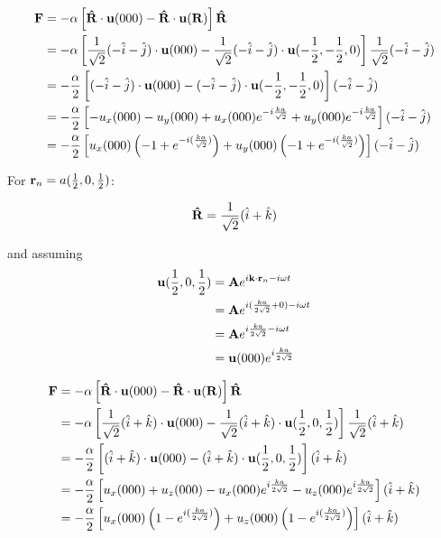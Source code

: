 \documentclass{article}
\begin{document}
\begin{align}
  \mathbf{F} &= - \alpha \left[ \mathbf{\hat{R}}\cdot \mathbf{u}(000) -
  \mathbf{\hat{R}}\cdot
  \mathbf{u}(\mathbf{R})\right]\mathbf{\hat{R}}\\
  &=- \alpha \left[ {1\over \sqrt{2}} (-\hat{i} - \hat{j}) \cdot
    \mathbf{u}(000) - {1\over \sqrt{2}} (-\hat{i} - \hat{j}) \cdot
    \mathbf{u}(-{1\over 2},-{1\over 2},0)\right]{1\over \sqrt{2}}(-\hat{i}
    - \hat{j})\\
  &=- {\alpha\over 2} \left[ (-\hat{i} - \hat{j}) \cdot
    \mathbf{u}(000) - (-\hat{i} - \hat{j}) \cdot
    \mathbf{u}(-{1\over 2},-{1\over 2},0)\right](-\hat{i}
    - \hat{j})\\
  &=- {\alpha\over 2} \left[-u_x(000) - u_y(000) + u_x(000) e^{-i {k a\over \sqrt{2}}} + u_y(000) e^{-i {k a\over \sqrt{2}}} \right](-\hat{i}
    - \hat{j}) \\
    &=- {\alpha\over 2} \left[ u_x(000)\left( -1 + e^{-i ({k
    a\over \sqrt{2}} )} \right) + u_y(000)\left(-1+ e^{-i ({k a\over \sqrt{2}} )}\right) \right](-\hat{i}
    - \hat{j}) \label{eq:F4}\\
\end{align}


For $\mathbf{r}_n = a({1\over
  2},0,{1\over 2})$:

\begin{equation}
  \mathbf{\hat{R}} = {1\over \sqrt{2}} (\hat{i} + \hat{k})
  \end{equation}

and  assuming
\begin{align}
  \mathbf{u}({1\over  2},0,{1\over 2}) &= \mathbf{A}e^{i \mathbf{k} \cdot \mathbf{r}_n - i \omega t}\\
  &= \mathbf{A}e^{i ({k a\over 2 \sqrt{2}} + 0 ) - i \omega t}\\
  &= \mathbf{A}e^{i {k a\over 2 \sqrt{2}} - i \omega t}\\
  &= \mathbf{u}(000) e^{i {k a\over 2 \sqrt{2}}} \\
  \end{align}

\begin{align}
  \mathbf{F} &= - \alpha \left[ \mathbf{\hat{R}}\cdot \mathbf{u}(000) -
  \mathbf{\hat{R}}\cdot
  \mathbf{u}(\mathbf{R})\right]\mathbf{\hat{R}}\\
  &=- \alpha \left[ {1\over \sqrt{2}} (\hat{i} + \hat{k}) \cdot
    \mathbf{u}(000) - {1\over \sqrt{2}} (\hat{i} + \hat{k}) \cdot
    \mathbf{u}({1\over 2},0,{1\over 2})\right]{1\over \sqrt{2}}(\hat{i}
    + \hat{k})\\
  &=- {\alpha\over 2} \left[ (\hat{i} + \hat{k}) \cdot
    \mathbf{u}(000) - (\hat{i} + \hat{k}) \cdot
    \mathbf{u}({1\over 2},0,{1\over 2})\right](\hat{i}
    + \hat{k})\\
  &=- {\alpha\over 2} \left[u_x(000) + u_z(000) - u_x(000) e^{i {k a\over 2\sqrt{2}}} - u_z(000) e^{i {k a\over 2\sqrt{2}}} \right](\hat{i}
    + \hat{k}) \\
    &=- {\alpha\over 2} \left[ u_x(000)\left( 1 - e^{i ({k
    a\over 2\sqrt{2}} )} \right) + u_z(000)\left(1- e^{i ({k a\over 2\sqrt{2}} )}\right) \right](\hat{i}
    + \hat{k}) \label{eq:F4}\\
\end{align}
\end{document}
